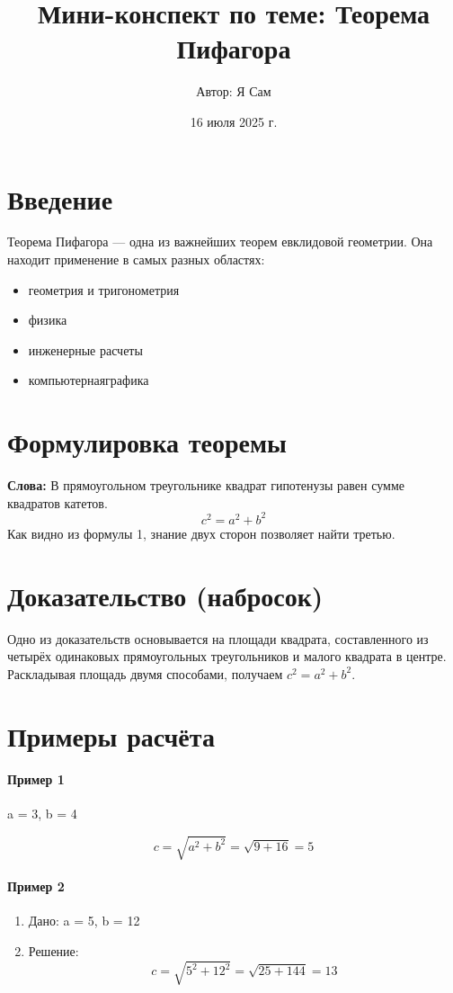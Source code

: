 \documentclass{article}
\title{Мини-конспект по теме: Теорема Пифагора}
\author{Автор: Я Сам}
\date{16 июля 2025 г.}
\begin{document}
\maketitle
\tableofcontents{}
\newpage
\section{Введение}
Теорема Пифагора — одна из важнейших теорем евклидовой геометрии. Она находит применение в самых разных областях:
\begin {itemize}
    \item  геометрия и тригонометрия
    \item физика
    \item инженерные расчеты
    \item компьютернаяграфика
\end {itemize}



\section{Формулировка теоремы}
\textbf{Слова: }  В прямоугольном треугольнике квадрат гипотенузы равен сумме квадратов катетов.
\begin {equation}
    c^2 = a^2 + b^2
\end{equation}
Как видно из формулы 1, знание двух сторон позволяет найти третью.



\section{ Доказательство (набросок)}
Одно из доказательств основывается на площади квадрата, составленного
из четырёх одинаковых прямоугольных треугольников и малого квадрата
в центре. Раскладывая площадь двумя способами, получаем $c^2 = a^2 +b^2$.


\section{Примеры расчёта}
\paragraph{Пример 1}
\begin{center}
    a = 3, b = 4
\end{center}
\[
    c = \sqrt{a^2 + b^2} = \sqrt{9 + 16} = 5
\]

\paragraph{Пример 2}
\begin{enumerate}
    \item Дано: a = 5, b = 12
    \item Решение:
    \[
        c = \sqrt{5^2 + 12^2} = \sqrt{25 + 144} = 13
    \]
\end{enumerate}
\end{document}
